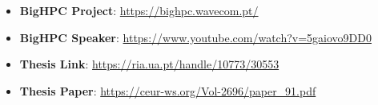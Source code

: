 \begin{itemize}
    \item \textbf{BigHPC Project}: \url{https://bighpc.wavecom.pt/}
    \item \textbf{BigHPC Speaker}: \url{https://www.youtube.com/watch?v=5gaiovo9DD0}
    \item \textbf{Thesis Link}: \url{https://ria.ua.pt/handle/10773/30553}
    \item \textbf{Thesis Paper}: \url{https://ceur-ws.org/Vol-2696/paper_91.pdf}
\end{itemize}
